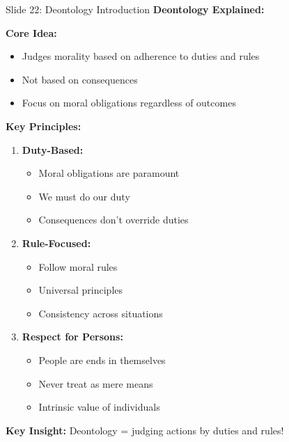 \documentclass[8pt]{beamer}
\begin{document}
	\begin{frame}{Slide 22: Deontology Introduction}
		\fontsize{6.5}{7.5}\selectfont
		\textbf{Deontology Explained:}
		
		\vspace{0.1cm}
		\textbf{Core Idea:}
		\begin{itemize}
			\item Judges morality based on adherence to duties and rules
			\item Not based on consequences
			\item Focus on moral obligations regardless of outcomes
		\end{itemize}
		
		\vspace{0.1cm}
		\textbf{Key Principles:}
		\begin{enumerate}
			\item \textbf{Duty-Based:}
			\begin{itemize}
				\item Moral obligations are paramount
				\item We must do our duty
				\item Consequences don't override duties
			\end{itemize}
			\item \textbf{Rule-Focused:}
			\begin{itemize}
				\item Follow moral rules
				\item Universal principles
				\item Consistency across situations
			\end{itemize}
			\item \textbf{Respect for Persons:}
			\begin{itemize}
				\item People are ends in themselves
				\item Never treat as mere means
				\item Intrinsic value of individuals
			\end{itemize}
		\end{enumerate}
		
		\textcolor{myblue}{\textbf{Key Insight:}} Deontology = \textcolor{myblue}{judging actions by duties and rules}!
	\end{frame}
	
\end{document}
